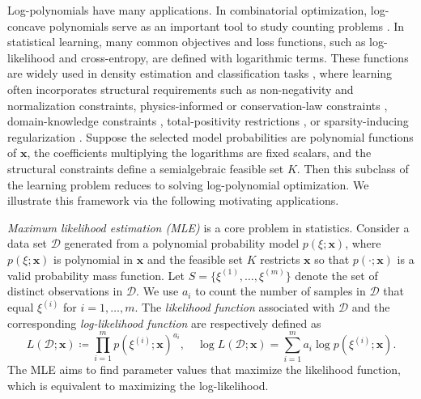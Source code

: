 \documentclass[pdflatex,sn-mathphys-num]{sn-jnl}%
\newcommand{\rd}[1]{{\color{red}#1}}
\newcommand{\vect}[1]{\boldsymbol{#1}}
\theoremstyle{thmstyleone}%
\theoremstyle{thmstyletwo}%
\theoremstyle{thmstylethree}%
\begin{document}
Log-polynomials have many applications.
In combinatorial optimization, 
log-concave polynomials serve as an important tool 
to study counting problems \cite{Anari24}. 
In statistical learning, many common objectives and loss functions,
such as log-likelihood and cross-entropy,
are defined with logarithmic terms.
These functions are widely used in density estimation
\cite{Carpenter2018,Dempster1977,Fisher1922,Vinayak2019,Silverman1986}
and classification tasks
\cite{Bishop2006,Goodfellow2016,Goodfellow2014,Mannor2005,Mao2023,Zhang2018},
where learning often incorporates structural requirements such as non-negativity and normalization constraints, physics-informed or conservation-law constraints \cite{Gusmao2024,Hansen2024,Rayas2022},
domain-knowledge constraints \cite{Karanam2025}, total-positivity restrictions \cite{Lauritzen2019}, or sparsity-inducing regularization
\cite{Banerjee2008,Srivastava2024}.
Suppose \rd{the selected model probabilities are polynomial functions
of $\vect{x}$, the coefficients multiplying the logarithms are fixed
scalars, and the structural constraints define a semialgebraic feasible
set $K$}.
Then this subclass of the learning problem reduces to solving
log-polynomial optimization.
We illustrate this framework via the following motivating applications.


{\it Maximum likelihood estimation (MLE)} is a core problem in statistics.
\rd{Consider a data set $\mathcal{D}$ generated from a polynomial
probability model $p(\xi; \vect{x})$, where $p(\xi;\vect{x})$ is
polynomial in $\vect{x}$ and the feasible set $K$ restricts
$\vect{x}$ so that $p(\cdot;\vect{x})$ is a valid probability mass
function.}
\rd{Let $S = \{\xi^{(1)}, \ldots, \xi^{(m)}\}$
denote the set of distinct observations in $\mathcal{D}$.}
We use $a_i$ to count the number of samples in $\mathcal{D}$ that equal $\xi^{(i)}$
for $i=1,\ldots, m$.
The {\em likelihood function} associated with $\mathcal{D}$ 
and the corresponding {\em log-likelihood function} are respectively 
defined as
\[
L(\mathcal{D};\vect{x}) \coloneqq \prod\limits_{i=1}^m p(\xi^{(i)};\vect{x})^{a_i},
\quad 
\log L(\mathcal{D}; \vect{x}) = \sum\limits_{i=1}^m a_i\log p(\xi^{(i)};\vect{x}).
\]
The MLE aims to find parameter values that maximize the likelihood function,
which is equivalent to maximizing the log-likelihood.
\end{document}
